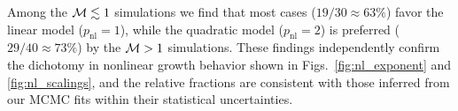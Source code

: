     Among the $\mathcal{M} \lesssim 1$ simulations we find that most cases ($19/30 \approx 63\%$) favor the linear model ($p_\mathrm{nl} = 1$), while the quadratic model ($p_\mathrm{nl} = 2$) is preferred ($29/40 \approx 73\%$) by the $\mathcal{M} > 1$ simulations. These findings independently confirm the dichotomy in nonlinear growth behavior shown in Figs.~\ref{fig:nl_exponent} and \ref{fig:nl_scalings}, and the relative fractions are consistent with those inferred from our MCMC fits within their statistical uncertainties.
